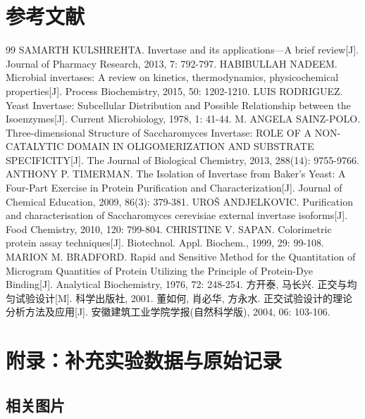 \documentclass[10.5pt, a4paper]{ctexart}
\begin{document}
\section{参考文献}
\vspace{-1cm}
    \begin{thebibliography}{99}
        \setlength{\itemsep}{0pt}
         SAMARTH KULSHREHTA. Invertase and its applications---A brief review[J]. Journal of Pharmacy Research, 2013, 7: 792-797.
         HABIBULLAH NADEEM. Microbial invertases: A review on kinetics, thermodynamics, physicochemical properties[J]. Process Biochemistry, 2015, 50: 1202-1210.
         LUIS RODRIGUEZ. Yeast Invertase: Subcellular Distribution and Possible Relationship between the Isoenzymes[J]. Current Microbiology, 1978, 1: 41-44.
         M. ANGELA SAINZ-POLO. Three-dimensional Structure of Saccharomyces Invertase: ROLE OF A NON-CATALYTIC DOMAIN IN OLIGOMERIZATION AND SUBSTRATE SPECIFICITY[J]. The Journal of Biological Chemistry, 2013, 288(14): 9755-9766.
         ANTHONY P. TIMERMAN. The Isolation of Invertase from Baker's Yeast: A Four-Part Exercise in Protein Purification and Characterization[J]. Journal of Chemical Education, 2009, 86(3): 379-381.
         UROŠ ANDJELKOVIC. Purification and characterisation of Saccharomyces cerevisiae external invertase isoforms[J]. Food Chemistry, 2010, 120: 799-804.
         CHRISTINE V. SAPAN. Colorimetric protein assay techniques[J]. Biotechnol. Appl. Biochem., 1999, 29: 99-108.
         MARION M. BRADFORD. Rapid and Sensitive Method for the Quantitation of Microgram Quantities of Protein Utilizing the Principle of Protein-Dye Binding[J]. Analytical Biochemistry, 1976, 72: 248-254.
         方开泰, 马长兴. 正交与均匀试验设计[M]. 科学出版社, 2001.
         董如何, 肖必华, 方永水. 正交试验设计的理论分析方法及应用[J]. 安徽建筑工业学院学报(自然科学版), 2004, 06: 103-106.
    \end{thebibliography}

\newpage

\section{附录：补充实验数据与原始记录}

\subsection{相关图片}
\end{document}
